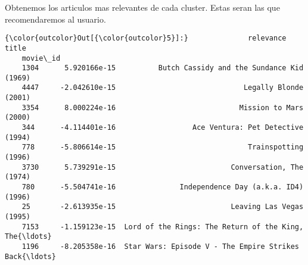 \documentclass[11pt]{article}
\begin{document}
Obtenemos los articulos mas relevantes de cada cluster. Estas seran las que
recomendaremos al usuario.

\begin{Verbatim}[commandchars=\\\{\}]
{\color{outcolor}Out[{\color{outcolor}5}]:}              relevance                                              title
    movie\_id
    1304      5.920166e-15          Butch Cassidy and the Sundance Kid (1969)
    4447     -2.042610e-15                              Legally Blonde (2001)
    3354      8.000224e-16                             Mission to Mars (2000)
    344      -4.114401e-16                  Ace Ventura: Pet Detective (1994)
    778      -5.806614e-15                               Trainspotting (1996)
    3730      5.739291e-15                           Conversation, The (1974)
    780      -5.504741e-16               Independence Day (a.k.a. ID4) (1996)
    25       -2.613935e-15                           Leaving Las Vegas (1995)
    7153     -1.159123e-15  Lord of the Rings: The Return of the King, The{\ldots}
    1196     -8.205358e-16  Star Wars: Episode V - The Empire Strikes Back{\ldots}
\end{Verbatim}
\end{document}
